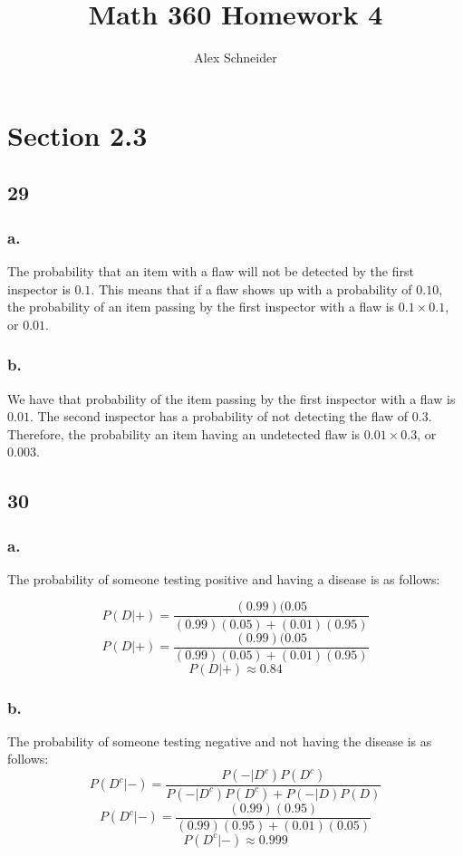 \documentclass[11pt]{article}
\title{Math 360  Homework 4}
\author{Alex Schneider}
\begin{document}
\maketitle
\section{Section 2.3}
\subsection{29}
\subsubsection{a.}
The probability that an item with a flaw will not be detected by the first
inspector is $0.1$. This means that if a flaw shows up with a probability of
$0.10$, the probability of an item passing by the first inspector with a flaw is
$0.1 \times 0.1$, or $0.01$. 

\subsubsection{b.}
We have that probability of the item passing by the first inspector with a flaw is $0.01$. The
second inspector has a probability of not detecting the flaw of $0.3$.
Therefore, the probability an item having an undetected flaw is $0.01 \times 0.3$,
or $0.003$. 

\subsection{30}
\subsubsection{a.}
The probability of someone testing positive and having a disease is as follows:

\[P(D|+) = \frac{(0.99)(0.05}{(0.99)(0.05)+(0.01)(0.95)}\]
\[P(D|+) = \frac{(0.99)(0.05}{(0.99)(0.05)+(0.01)(0.95)}\]
\[P(D|+) \approx 0.84\]

\subsubsection{b.}
The probability of someone testing negative and not having the disease is as
follows:
\[P(D^c|-) = \frac{P(-|D^c)P(D^c)}{P(-|D^c)P(D^c)+P(-|D)P(D)} \]
\[P(D^c|-) = \frac{(0.99)(0.95)}{(0.99)(0.95)+(0.01)(0.05)} \]
\[P(D^c|-) \approx 0.999 \]
\end{document}
